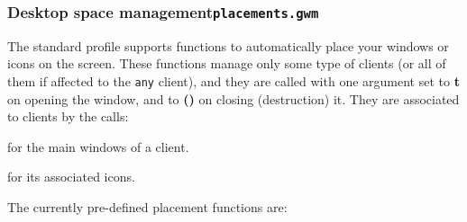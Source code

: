 \subsubsection{Desktop space management\hfil{\tt placements.gwm}}

\label{set-placement}
The standard profile supports functions to automatically place your windows
or icons on the screen. These functions manage only some type of clients (or
all of them if affected to the \verb"any" client), and they are called
with one argument set to {\bf t} on opening the window, and to {\bf ()} on
closing (destruction) it. They are associated to clients by the calls:

\begin{description}

 for the
main windows of a client. 

 for
its associated icons.

\end{description}

The currently pre-defined placement functions are:


